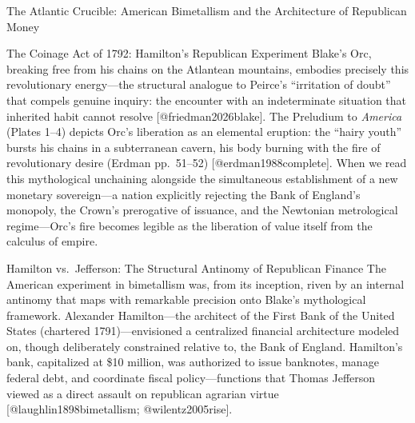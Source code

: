\documentclass[
  ignorenonframetext,
]{beamer}
\begin{document}
\begin{frame}{The Atlantic Crucible: American Bimetallism and the
Architecture of Republican Money}
\begin{block}{The Coinage Act of 1792: Hamilton's Republican Experiment}
Blake's Orc, breaking free from his chains on the Atlantean mountains,
embodies precisely this revolutionary energy---the structural analogue
to Peirce's ``irritation of doubt'' that compels genuine inquiry: the
encounter with an indeterminate situation that inherited habit cannot
resolve {[}@friedman2026blake{]}. The Preludium to \emph{America}
(Plates 1--4) depicts Orc's liberation as an elemental eruption: the
``hairy youth'' bursts his chains in a subterranean cavern, his body
burning with the fire of revolutionary desire (Erdman pp.~51--52)
{[}@erdman1988complete{]}. When we read this mythological unchaining
alongside the simultaneous establishment of a new monetary sovereign---a
nation explicitly rejecting the Bank of England's monopoly, the Crown's
prerogative of issuance, and the Newtonian metrological regime---Orc's
fire becomes legible as the liberation of value itself from the calculus
of empire.
\end{block}

\begin{block}{Hamilton vs.~Jefferson: The Structural Antinomy of
Republican Finance}
\protect{}\label{hamilton-vs.-jefferson-the-structural-antinomy-of-republican-finance}
The American experiment in bimetallism was, from its inception, riven by
an internal antinomy that maps with remarkable precision onto Blake's
mythological framework. Alexander Hamilton---the architect of the First
Bank of the United States (chartered 1791)---envisioned a centralized
financial architecture modeled on, though deliberately constrained
relative to, the Bank of England. Hamilton's bank, capitalized at \$10
million, was authorized to issue banknotes, manage federal debt, and
coordinate fiscal policy---functions that Thomas Jefferson viewed as a
direct assault on republican agrarian virtue
{[}@laughlin1898bimetallism; @wilentz2005rise{]}.


\end{block}
\end{frame}
\end{document}
